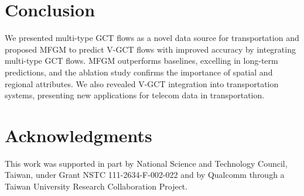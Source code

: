 \documentclass[letterpaper]{article} %
\begin{document}
\section{Conclusion}
We presented multi-type GCT flows as a novel data source for transportation and proposed MFGM to predict V-GCT flows with improved accuracy by integrating multi-type GCT flows. MFGM outperforms baselines, excelling in long-term predictions, and the ablation study confirms the importance of spatial and regional attributes. We also revealed V-GCT integration into transportation systems, presenting new applications for telecom data in transportation.

\clearpage

\section{Acknowledgments}
This work was supported in part by National Science and Technology Council, Taiwan, under Grant NSTC 111-2634-F-002-022 and by Qualcomm through a Taiwan University Research Collaboration Project.


\end{document}
